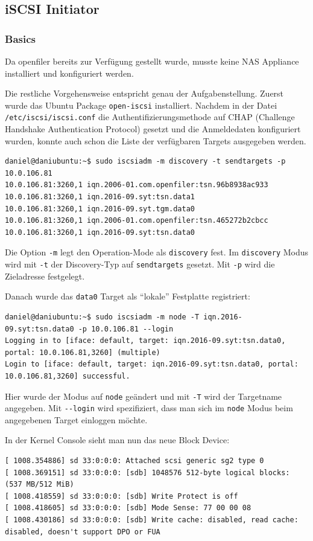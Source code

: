 \subsection{iSCSI Initiator}
\subsubsection{Basics}
Da openfiler bereits zur Verfügung gestellt wurde, musste keine NAS Appliance installiert und konfiguriert werden.

Die restliche Vorgehensweise entspricht genau der Aufgabenstellung. Zuerst wurde das Ubuntu Package \texttt{open-iscsi} installiert. Nachdem in der Datei \texttt{/etc/iscsi/iscsi.conf} die Authentifizierungsmethode auf CHAP (Challenge Handshake Authentication Protocol) gesetzt und die Anmeldedaten konfiguriert wurden, konnte auch schon die Liste der verfügbaren Targets ausgegeben werden.\clearpage

\begin{lstlisting}[style=bash, caption=Verfügbare Targets]
daniel@daniubuntu:~$ sudo iscsiadm -m discovery -t sendtargets -p 10.0.106.81
10.0.106.81:3260,1 iqn.2006-01.com.openfiler:tsn.96b8938ac933
10.0.106.81:3260,1 iqn.2016-09.syt:tsn.data1
10.0.106.81:3260,1 iqn.2016-09.syt.tgm.data0
10.0.106.81:3260,1 iqn.2006-01.com.openfiler:tsn.465272b2cbcc
10.0.106.81:3260,1 iqn.2016-09.syt:tsn.data0
\end{lstlisting}
Die Option \texttt{-m} legt den Operation-Mode als \texttt{discovery} fest. Im \texttt{discovery} Modus wird mit \texttt{-t} der Discovery-Typ auf \texttt{sendtargets} gesetzt. Mit \texttt{-p} wird die Zieladresse festgelegt.


Danach wurde das \texttt{data0} Target als ``lokale'' Festplatte registriert:
\begin{lstlisting}[style=bash, caption=Target ``lokal'' registrieren]
daniel@daniubuntu:~$ sudo iscsiadm -m node -T iqn.2016-09.syt:tsn.data0 -p 10.0.106.81 --login
Logging in to [iface: default, target: iqn.2016-09.syt:tsn.data0, portal: 10.0.106.81,3260] (multiple)
Login to [iface: default, target: iqn.2016-09.syt:tsn.data0, portal: 10.0.106.81,3260] successful.
\end{lstlisting}
Hier wurde der Modus auf \texttt{node} geändert und mit \texttt{-T} wird der Targetname angegeben. Mit \texttt{-{}-login} wird spezifiziert, dass man sich im \texttt{node} Modus beim angegebenen Target einloggen möchte.

In der Kernel Console sieht man nun das neue Block Device:
\begin{lstlisting}[style=bash, caption=neues Block Device]
[ 1008.354886] sd 33:0:0:0: Attached scsi generic sg2 type 0
[ 1008.369151] sd 33:0:0:0: [sdb] 1048576 512-byte logical blocks: (537 MB/512 MiB)
[ 1008.418559] sd 33:0:0:0: [sdb] Write Protect is off
[ 1008.418605] sd 33:0:0:0: [sdb] Mode Sense: 77 00 00 08
[ 1008.430186] sd 33:0:0:0: [sdb] Write cache: disabled, read cache: disabled, doesn't support DPO or FUA
\end{lstlisting}

